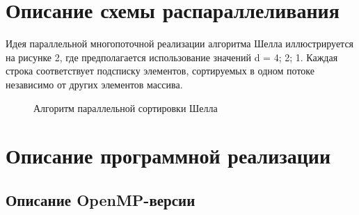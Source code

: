 \documentclass{report}
\begin{document}
\newpage

\section*{Описание схемы распараллеливания}
Идея параллельной многопоточной реализации  алгоритма  Шелла  иллюстрируется  на рисунке 2,  где  предполагается  использование значений d = 4; 2; 1. Каждая строка соответствует подсписку элементов, сортируемых в одном потоке независимо от других элементов массива.
\begin{figure}[h]
\caption{Алгоритм параллельной сортировки Шелла}
\end{figure}

\newpage

\section*{Описание программной реализации}
\subsection*{Описание OpenMP-версии}
\end{document}
